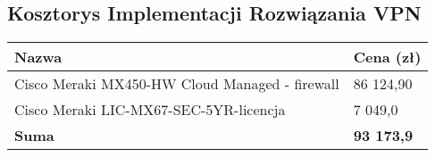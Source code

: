 \subsection{Kosztorys Implementacji Rozwiązania VPN}
    \begin{flushleft}
        \begin{table}[h]
            \renewcommand{\arraystretch}{1.5}
            \begin{tabular}{|l|l|}
                \hline
                \textbf{Nazwa} & \textbf{Cena (zł)} \\
                \hline
                Cisco Meraki MX450-HW Cloud Managed - firewall & 86 124,90 \\
                Cisco Meraki LIC-MX67-SEC-5YR-licencja & 7 049,0 \\
                \hline
                \textbf{Suma} & \textbf{93 173,9} \\
                \hline
            \end{tabular}
        \end{table}
    \end{flushleft}
